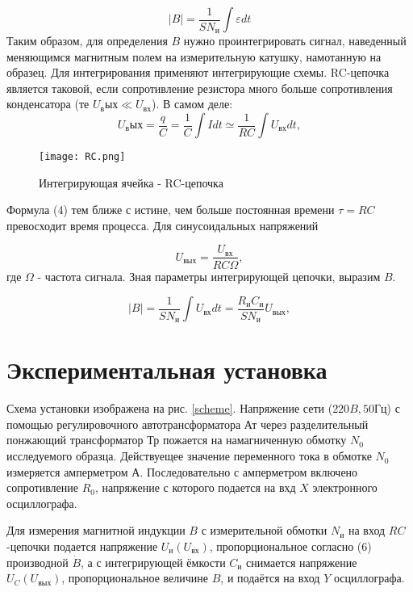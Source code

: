 \documentclass[12pt,a4paper]{article}
\begin{document}
\begin{equation}
    |B| = \frac{1}{SN_\text{и}}\int \varepsilon dt \label{eq:ref}
\end{equation}
Таким образом, для определения $B$ нужно проинтегрировать сигнал, наведенный меняющимся магнитным полем на измерительную катушку,
намотанную на образец. Для интегрирования применяют интегрирующие схемы. RC-цепочка является таковой, если сопротивление резистора
 много больше сопротивления конденсатора (те $U_вых \ll U_{вх} $). В самом деле:
 \begin{equation}
    U_вых = \frac{q}{C} = \frac{1}{C} \int Idt \simeq \frac{1}{RC}\int U_{вх}dt, \label{eq:ref}
\end{equation}

\begin{figure}[H]
    \begin{center}
    \texttt{[image: RC.png]}
    \caption{Интегрирующая ячейка - RC-цепочка}
    \label{rc} %
    \end{center}
\end{figure}

Формула (4) тем ближе с истине, чем больше постоянная времени $\tau = RC$ превосходит время процесса. Для  синусоидальных напряжений

\begin{equation}
    U_{вых} = \frac{U_{вх}}{RC\varOmega}, \label{eq:ref}
\end{equation}
где $\varOmega$ - частота сигнала. Зная параметры интегрирующей цепочки, выразим $B$.

\begin{equation}
    |B| = \frac{1}{SN_и} \int U_{вх}dt = \frac{R_иC_и}{SN_и}U_{вых}, \label{eq:ref}
\end{equation}

\section{Экспериментальная установка}
Схема установки изображена на рис. \ref{scheme}. Напряжение сети ($220 B, 50 Гц$) с помощью регулировочного автотрансформатора Ат через разделительный понжающий трансформатор Тр пожается на намагниченную обмотку $N_0$ исследуемого образца. 
Действуещее значение переменного тока в обмотке $N_0$ измеряется амперметром А. Последовательно  с амперметром включено сопротивление $R_0$, напряжение с которого подается на вхд $X$ электронного осциллографа. 

\hyphenation{}
Для измерения магнитной индукции $B$ с измерительной обмотки $N_и$ на вход $RC$-цепочки подается напряжение $U_и(U_{вх})$, пропорциональное согласно (6) производной 
$\dot{B}$, а с интегрирующей ёмкости $C_и$ снимается напряжение $U_C(U_{вых})$, пропорциональное величине $B$, и подаётся на вход $Y$ осциллографа. 
\end{document}
